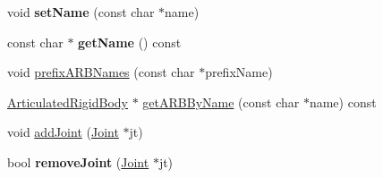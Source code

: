 \begin{DoxyCompactItemize}
\item 
\hypertarget{classCartWheel_1_1Physics_1_1ArticulatedFigure_a1fe4f0c5272c4326fbe481415130edc8}{
void {\bfseries setName} (const char $\ast$name)}
\label{classCartWheel_1_1Physics_1_1ArticulatedFigure_a1fe4f0c5272c4326fbe481415130edc8}

\item 
\hypertarget{classCartWheel_1_1Physics_1_1ArticulatedFigure_a757051ff8ecbdd64d7bdf9d7f5b7e756}{
const char $\ast$ {\bfseries getName} () const }
\label{classCartWheel_1_1Physics_1_1ArticulatedFigure_a757051ff8ecbdd64d7bdf9d7f5b7e756}

\item 
void \hyperlink{classCartWheel_1_1Physics_1_1ArticulatedFigure_abc0037a8a62028a4d13746e8d7a6f212}{prefixARBNames} (const char $\ast$prefixName)
\item 
\hyperlink{classCartWheel_1_1Physics_1_1ArticulatedRigidBody}{ArticulatedRigidBody} $\ast$ \hyperlink{classCartWheel_1_1Physics_1_1ArticulatedFigure_a26a2bdded2da09108ac87528fd6d2985}{getARBByName} (const char $\ast$name) const 
\item 
void \hyperlink{classCartWheel_1_1Physics_1_1ArticulatedFigure_ad2e269f91b3670c3580d2fd6057d74d1}{addJoint} (\hyperlink{classCartWheel_1_1Physics_1_1Joint}{Joint} $\ast$jt)
\item 
\hypertarget{classCartWheel_1_1Physics_1_1ArticulatedFigure_ae0b67af03fc7a9de669b8e543039a9f2}{
bool {\bfseries removeJoint} (\hyperlink{classCartWheel_1_1Physics_1_1Joint}{Joint} $\ast$jt)}
\label{classCartWheel_1_1Physics_1_1ArticulatedFigure_ae0b67af03fc7a9de669b8e543039a9f2}


\end{DoxyCompactItemize}
